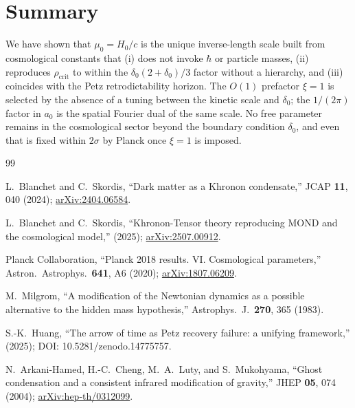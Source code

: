 \documentclass[prd,twocolumn,superscriptaddress,longbibliography,floatfix]{revtex4-2}
\newcommand{\Hzero}{H_{0}}
\newcommand{\muzero}{\mu_{0}}
\newcommand{\rhocrit}{\rho_{\mathrm{crit}}}
\begin{document}
\section{Summary}
\label{sec:summary}

We have shown that $\muzero = \Hzero/c$ is the unique
inverse-length scale built from cosmological constants
that (i) does not invoke $\hbar$ or particle masses,
(ii) reproduces $\rhocrit$ to within the
$\delta_{0}(2+\delta_{0})/3$ factor without a
hierarchy, and (iii) coincides with the Petz
retrodictability horizon.  The
$O(1)$ prefactor $\xi = 1$ is selected by the absence
of a tuning between the kinetic scale and $\delta_{0}$;
the $1/(2\pi)$ factor in $a_{0}$ is the spatial
Fourier dual of the same scale.  No free parameter
remains in the cosmological sector beyond the boundary
condition $\delta_{0}$, and even that is fixed within
$2\sigma$ by Planck once $\xi = 1$ is imposed.

\begin{thebibliography}{99}

L.~Blanchet and C.~Skordis,
``Dark matter as a Khronon condensate,''
JCAP \textbf{11}, 040 (2024);
\href{https://arxiv.org/abs/2404.06584}{arXiv:2404.06584}.

L.~Blanchet and C.~Skordis,
``Khronon-Tensor theory reproducing MOND and the cosmological model,''
(2025);
\href{https://arxiv.org/abs/2507.00912}{arXiv:2507.00912}.

Planck Collaboration,
``Planck 2018 results. VI. Cosmological parameters,''
Astron.\ Astrophys.\ \textbf{641}, A6 (2020);
\href{https://arxiv.org/abs/1807.06209}{arXiv:1807.06209}.

M.~Milgrom,
``A modification of the Newtonian dynamics as a possible
alternative to the hidden mass hypothesis,''
Astrophys.\ J.\ \textbf{270}, 365 (1983).

S.-K.~Huang,
``The arrow of time as Petz recovery failure:
a unifying framework,''
(2025);
DOI: 10.5281/zenodo.14775757.

N.~Arkani-Hamed, H.-C.~Cheng, M.~A.~Luty,
and S.~Mukohyama,
``Ghost condensation and a consistent infrared
modification of gravity,''
JHEP \textbf{05}, 074 (2004);
\href{https://arxiv.org/abs/hep-th/0312099}{arXiv:hep-th/0312099}.

\end{thebibliography}
\end{document}
